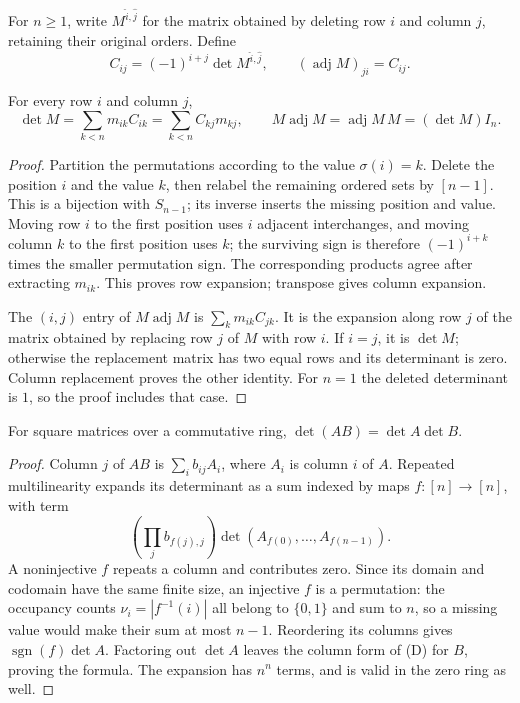 For $n\ge1$, write $M^{\widehat i,\widehat j}$ for the matrix obtained by
deleting row $i$ and column $j$, retaining their original orders. Define
\[
 C_{ij}=(-1)^{i+j}\det M^{\widehat i,\widehat j},\qquad
 (\operatorname{adj}M)_{ji}=C_{ij}.
\]

\begin{lemma}
\label{lem:adjugate}
For every row $i$ and column $j$,
\[
 \det M=\sum_{k<n}m_{ik}C_{ik}
       =\sum_{k<n}C_{kj}m_{kj},
 \qquad
 M\operatorname{adj}M=\operatorname{adj}M\,M=(\det M)I_n.
\]
\end{lemma}
\begin{proof}
Partition the permutations according to the value $\sigma(i)=k$.
Delete the position $i$ and the value $k$, then relabel the remaining
ordered sets by $[n-1]$. This is a bijection with $S_{n-1}$; its inverse
inserts the missing position and value. Moving row $i$ to the first
position uses $i$ adjacent interchanges, and moving column $k$ to the
first position uses $k$; the surviving sign is therefore
$(-1)^{i+k}$ times the smaller permutation sign. The corresponding
products agree after extracting $m_{ik}$. This proves row expansion;
transpose gives column expansion.

The $(i,j)$ entry of $M\operatorname{adj}M$ is
$\sum_k m_{ik}C_{jk}$. It is the expansion along row $j$ of the matrix
obtained by replacing row $j$ of $M$ with row $i$. If $i=j$, it is
$\det M$; otherwise the replacement matrix has two equal rows and its
determinant is zero. Column replacement proves the other identity.
For $n=1$ the deleted determinant is $1$, so the proof includes that case.
\end{proof}

\begin{lemma}[Multiplicativity]
\label{lem:detmul}
For square matrices over a commutative ring,
$\det(AB)=\det A\det B$.
\end{lemma}
\begin{proof}
Column $j$ of $AB$ is $\sum_i b_{ij}A_i$, where $A_i$ is column $i$ of
$A$. Repeated multilinearity expands its determinant as a sum indexed
by maps $f:[n]\to[n]$, with term
\[
                 \left(\prod_j b_{f(j),j}\right)
                        \det(A_{f(0)},\ldots,A_{f(n-1)}).
\]
A noninjective $f$ repeats a column and contributes zero. Since its
domain and codomain have the same finite size, an injective $f$ is a
permutation: the occupancy counts $\nu_i=|f^{-1}(i)|$ all belong to
$\{0,1\}$ and sum to $n$, so a missing value would make their sum at
most $n-1$. Reordering its columns gives
$\operatorname{sgn}(f)\det A$. Factoring out $\det A$ leaves the column
form of (D) for $B$, proving the formula. The expansion has $n^n$ terms,
and is valid in the zero ring as well.
\end{proof}

